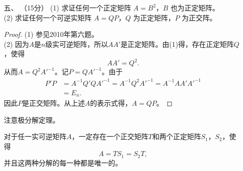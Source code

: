 \begin{enumerate}[1~]
\begin{proof}
\begin{subproof}
从而$k_1=0$，于是\ref{k1alpha}式变为\begin{equation}\label{k2alpha}
k_2\mathscr{A}^2\boldsymbol{\alpha}+\cdots+k_{n-1}\mathscr{A}^{n-1}\boldsymbol{\alpha}=0.
\end{equation}
仿照上面的步骤，依次用$\mathscr{A}^{n-3}$，$\mathscr{A}^{n-4}$，$\dots$，$\mathscr{A}$作用之，可得\[
k_0=k_1=k_2=\cdots=k_{n-1}=0.
\]
因此$\boldsymbol{\alpha}, \mathscr{A}\boldsymbol{\alpha}, \mathscr{A}^2\boldsymbol{\alpha}, \dots, \mathscr{A}^{n-1}\boldsymbol{\alpha}$线性无关，断言成立。
\end{subproof}
因为\[
\mathscr{A}(\boldsymbol{\alpha}, \mathscr{A}\boldsymbol{\alpha}, \mathscr{A}^2\boldsymbol{\alpha}, \dots, \mathscr{A}^{n-1}\boldsymbol{\alpha})=(\boldsymbol{\alpha}, \mathscr{A}\boldsymbol{\alpha}, \mathscr{A}^2\boldsymbol{\alpha}, \dots, \mathscr{A}^{n-1}\boldsymbol{\alpha})\left( \begin{matrix} { 0 } & { } & { } & { } & { } \\ { 1 } & { \ddots } & { } & { } & { } \\ { } & { \ddots } & { \ddots } & { } & { } \\ { } & { } & { 1 } & { 0 } & { } \\ { } & { } & { } & { 1 } & { 0 } \end{matrix} \right).
\]
所以 $\mathscr{A}$ 在基 $\boldsymbol{\alpha}, \mathscr{A}\boldsymbol{\alpha}, \mathscr{A}^2\boldsymbol{\alpha}, \dots, \mathscr{A}^{n-1}\boldsymbol{\alpha}$ 下的矩阵为 $\left( \begin{smallmatrix} { 0 } & { } & { } & { } & { } \\ { 1 } & { \ddots } & { } & { } & { } \\ { } & { \ddots } & { \ddots } & { } & { } \\ { } & { } & { 1 } & { 0 } & { } \\ { } & { } & { } & { 1 } & { 0 } \end{smallmatrix} \right)$。
\end{proof}

\item[五、]（15分）
(1) 求证任何一个正定矩阵 $A = B^2$，$B$ 也为正定矩阵。\\
(2) 求证任何一个可逆实矩阵 $A = QP$，$Q$ 为正定矩阵，$P$ 为正交阵。
\begin{proof}
(1) 参见2010年第六题。\\
(2) 
因为$A$是$n$级实可逆矩阵，所以$AA'$是正定矩阵。由(1)得，存在正定矩阵$Q$，使得\[
AA'= Q^2.
\]
从而$A=Q^2{A'}^{-1}$。记$P=Q{A'}^{-1}$。由于\begin{align*}
P'P&=A^{-1}Q'Q{A'}^{-1}=A^{-1}Q^2{A'}^{-1}=A^{-1}AA'{A'}^{-1}\\
&=E_n.
\end{align*}
因此$P$是正交矩阵。从上述$A$的表示式得，$A=QP$。
\end{proof}
\begin{remark}
注意极分解定理。
\begin{theorem}[极分解定理]
对于任一实可逆矩阵$A$，一定存在一个正交矩阵$T$和两个正定矩阵$S_1$，$S_2$，使得\[
A=TS_1= S_2T,
\]
并且这两种分解的每一种都是唯一的。
\end{theorem}
\end{remark}


\end{enumerate}
